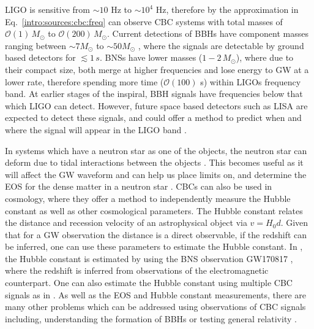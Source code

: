 \gls{LIGO} is sensitive from $\sim 10$ Hz to $\sim 10^4$ Hz, therefore by the
approximation in Eq.~\ref{intro:sources:cbc:freq} can observe \gls{CBC} systems with total masses of $\mathcal{O}(1)\,M_{\odot}$ to
$\mathcal{O}(200)\, M_{\odot}$. Current detections of \glspl{BBH} have component masses ranging between $\sim 7M_{\odot}$ to $\sim
50M_{\odot}$ 
\citep{ligoscientificcollaborationandvirgocollaboration2019GWTC1GravitationalWave},
where the signals are detectable by ground based detectors for $\lesssim 1\,s$.
\glspl{BNS} have lower masses ($1-2\,M_{\odot}$), where due to their compact
size, both merge at higher frequencies and lose energy to \gls{GW} at a lower
rate, therefore spending more time ($\mathcal{O}(100)$ s) within \glspl{LIGO}
frequency band.  At earlier stages of the inspiral, \gls{BBH} signals have
frequencies below that which \gls{LIGO} can detect.  However, future space
based detectors such as \gls{LISA} \citep{danzmann1996LISALaser} are expected to
detect these signals, and could offer a method to predict when and where the
signal will appear in the \gls{LIGO} band \citep{sesana2016ProspectsMultiband}. 

In systems which have a neutron star as one of the objects, the neutron star
can deform due to tidal interactions between the objects
\citep{flanagan2008ConstrainingNeutronstar}.  This becomes useful as it will
affect the \gls{GW} waveform and can help us place limits on, and determine the
\gls{EOS} for the dense matter in a neutron star
\citep{harry2018ObservingMeasuring}.  \glspl{CBC} can also be used in
cosmology, where they offer a method to independently measure the Hubble
constant as well as other cosmological parameters.  The Hubble constant relates
the distance and recession velocity of an astrophysical object via $v = H_0 d$.
Given that for a \gls{GW} observation the distance is a direct observable, if
the redshift can be inferred, one can use these parameters to estimate the
Hubble constant.  In
\cite{theligoscientificcollaborationandthevirgocollaboration2017GravitationalwaveStandard},
the Hubble constant is estimated by using the \gls{BNS} observation GW170817
\citep{abbott2017GW170817Observation}, where the redshift is inferred from
observations of the electromagnetic counterpart.  One can also estimate the Hubble constant using multiple \gls{CBC} signals as in \citep{delpozzo2012InferenceCosmological}.  As well as the \gls{EOS} and Hubble constant measurements, there are many other problems which can be addressed using observations of \gls{CBC} signals including, understanding the formation of \glspl{BBH}
\citep{zevin2017ConstrainingFormation,mandel2018MergingStellarmass} or testing
general relativity
\citep{theligoscientificcollaborationandthevirgocollaboration2019TestsGeneral}. 

